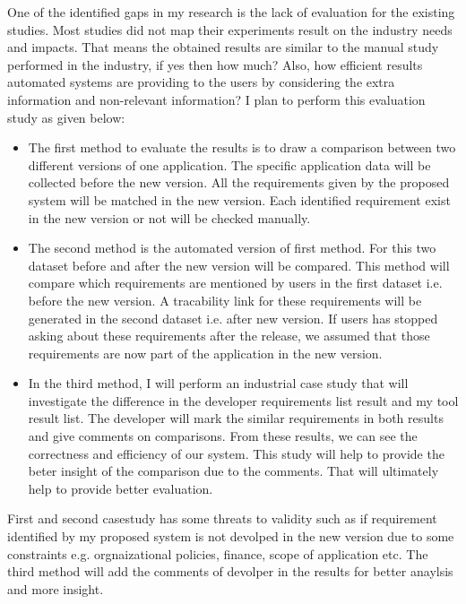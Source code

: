 One of the identified gaps in my research is the lack of evaluation for the existing studies. Most studies did not map their experiments result on the industry needs and impacts. That means the obtained results are similar to the manual study performed in the industry, if yes then how much? Also, how efficient results automated systems are providing to the users by considering the extra information and non-relevant information? I plan to perform this evaluation study as given below: \\
\begin {itemize}
\item{The first method to evaluate the results is to draw a comparison between two different versions of one application. The specific application data will be collected before the new version. All the requirements given by the proposed system will be matched in the new version. Each identified requirement exist in the new version or not will be checked manually.\\}
\item{The second method is the automated version of first method. For this two dataset before and after the new version will be compared. This method will compare which requirements  are mentioned by users in the first dataset i.e. before the new version. A tracability link for these requirements will be generated in the second dataset i.e. after new version. If users has stopped asking about these requirements after the release, we assumed that those requirements are now part of the application in the new version.\\}
\item{In the third method, I will perform an industrial case study that will investigate the difference in the developer requirements list result and my tool result list. The developer will mark the similar requirements in both results and give comments on  comparisons. From these results, we can see the correctness and efficiency of our system. This study will help to provide the beter insight of the comparison due to the comments. That will ultimately help to provide better evaluation.\\}
\end{itemize}
First and second casestudy has some threats to validity such as if requirement identified by my proposed system is not devolped in the new version due to some constraints e.g. orgnaizational policies, finance, scope of application etc. The third method will add the comments of devolper in the results for better anaylsis and more insight.